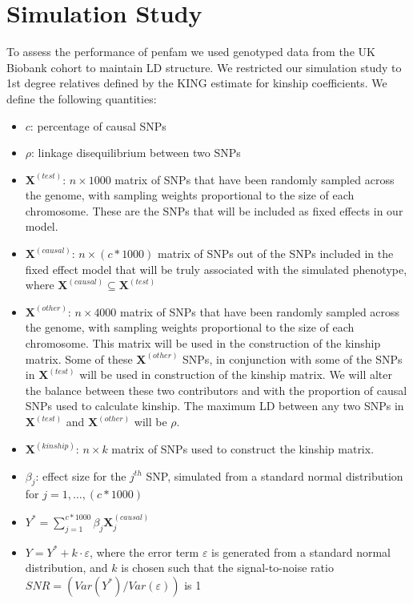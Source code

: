 \documentclass[12pt,letter]{article}\usepackage[]{graphicx}\usepackage[]{color}
\newcommand{\bX}{\textbf{X}}
\begin{document}
\section{Simulation Study}

To assess the performance of penfam we used genotyped data from the UK Biobank cohort to maintain LD structure. We restricted our simulation study to 1st degree relatives defined by the KING estimate for kinship coefficients. We define the following quantities:

\begin{itemize}
	\item $c$: percentage of causal SNPs
	\item $\rho$: linkage disequilibrium between two SNPs
	\item $\bX^{(test)}$: $n \times 1000$ matrix of SNPs that have been randomly sampled across the genome, with sampling weights proportional to the size of each chromosome. These are the SNPs that will be included as fixed effects in our model.
	\item $\bX^{(causal)}$: $n \times (c*1000)$ matrix of SNPs out of the SNPs included in the fixed effect model that will be truly associated with the simulated phenotype, where $\bX^{(causal)} \subseteq \bX^{(test)}$
	\item $\bX^{(other)}$: $n \times 4000$ matrix of SNPs that have been randomly sampled across the genome, with sampling weights proportional to the size of each chromosome. This matrix will be used in the construction of the kinship matrix. Some of these $\bX^{(other)}$ SNPs, in conjunction with some of the SNPs in $\bX^{(test)}$ will be used in construction of the kinship matrix. We will alter the balance between these two contributors and with the proportion of causal SNPs used to calculate kinship. The maximum LD between any two SNPs in $\bX^{(test)}$ and $\bX^{(other)}$ will be $\rho$.
	\item $\bX^{(kinship)}$: $n \times k$ matrix of SNPs used to construct the kinship matrix.
	\item $\beta_j$: effect size for the $j^{th}$ SNP, simulated from a standard normal distribution for $j = 1, \ldots, (c*1000)$
	\item $Y^* = \sum_{j=1}^{c*1000} \beta_j \bX^{(causal)}_j$
	\item $Y = Y^* + k \cdot \varepsilon$, where the error term $\varepsilon$ is generated from a standard normal distribution, and $k$ is chosen such that the signal-to-noise ratio $SNR =\left(Var(Y^*)/Var(\varepsilon)\right)$ is 1
\end{itemize}
\end{document}
